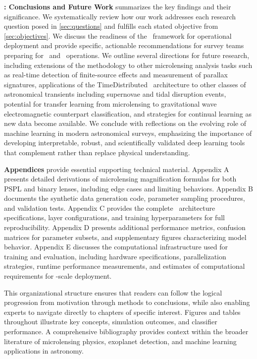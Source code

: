 \textbf{: Conclusions and Future Work} summarizes the key findings and their significance. We systematically review how our work addresses each research question posed in \cref{sec:questions} and fulfills each stated objective from \cref{sec:objectives}. We discuss the readiness of the \cnn\ framework for operational deployment and provide specific, actionable recommendations for survey teams preparing for \lsst\ and \romantel\ operations. We outline several directions for future research, including extensions of the methodology to other microlensing analysis tasks such as real-time detection of finite-source effects and measurement of parallax signatures, applications of the TimeDistributed \cnn\ architecture to other classes of astronomical transients including supernovae and tidal disruption events, potential for transfer learning from microlensing to gravitational wave electromagnetic counterpart classification, and strategies for continual learning as new data become available. We conclude with reflections on the evolving role of machine learning in modern astronomical surveys, emphasizing the importance of developing interpretable, robust, and scientifically validated deep learning tools that complement rather than replace physical understanding.

\textbf{Appendices} provide essential supporting technical material. Appendix A presents detailed derivations of microlensing magnification formulas for both PSPL and binary lenses, including edge cases and limiting behaviors. Appendix B documents the synthetic data generation code, parameter sampling procedures, and validation tests. Appendix C provides the complete \cnn\ architecture specifications, layer configurations, and training hyperparameters for full reproducibility. Appendix D presents additional performance metrics, confusion matrices for parameter subsets, and supplementary figures characterizing model behavior. Appendix E discusses the computational infrastructure used for training and evaluation, including hardware specifications, parallelization strategies, runtime performance measurements, and estimates of computational requirements for \lsst-scale deployment.

This organizational structure ensures that readers can follow the logical progression from motivation through methods to conclusions, while also enabling experts to navigate directly to chapters of specific interest. Figures and tables throughout illustrate key concepts, simulation outcomes, and classifier performance. A comprehensive bibliography provides context within the broader literature of microlensing physics, exoplanet detection, and machine learning applications in astronomy.